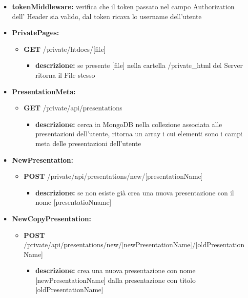 {{\begin{itemize}
		\item \textbf{tokenMiddleware:} verifica che il token passato nel campo Authorization dell' Header sia valido, dal token ricava lo username dell'utente
		
		\item \textbf{PrivatePages:}
			\begin{itemize}
			\item  \textbf{GET} /private/htdocs/[file] 
				\begin{itemize} 
				\item \textbf{descrizione:} se presente [file] nella cartella /private\_html del Server\ped{g} ritorna il File stesso
				\end{itemize}
			\end{itemize}
			
		\item \textbf{PresentationMeta:}
			\begin{itemize}
			\item  \textbf{GET} /private/api/presentations 
				\begin{itemize} 
				\item \textbf{descrizione:} cerca in MongoDB nella collezione associata alle presentazioni dell'utente, ritorna un array i cui elementi sono i campi meta delle presentazioni dell'utente
				\end{itemize}
			\end{itemize}
			
		\item \textbf{NewPresentation:}
			\begin{itemize}
			\item  \textbf{POST} /private/api/presentations/new/[presentationName] 
				\begin{itemize} 
				\item \textbf{descrizione:} se non esiste gi\`{a} crea una nuova presentazione con il nome [presentatioNname]
				\end{itemize}
			\end{itemize}
			
		\item \textbf{NewCopyPresentation:}
			\begin{itemize}
			\item  \textbf{POST} /private/api/presentations/new/[newPresentationName]/[oldPresentationName]
				\begin{itemize} 
				\item \textbf{descrizione:} crea una nuova presentazione con nome [newPresentationName] dalla presentazione con titolo [oldPresentationName]
				\end{itemize}
			\end{itemize}


\end{itemize}}}
